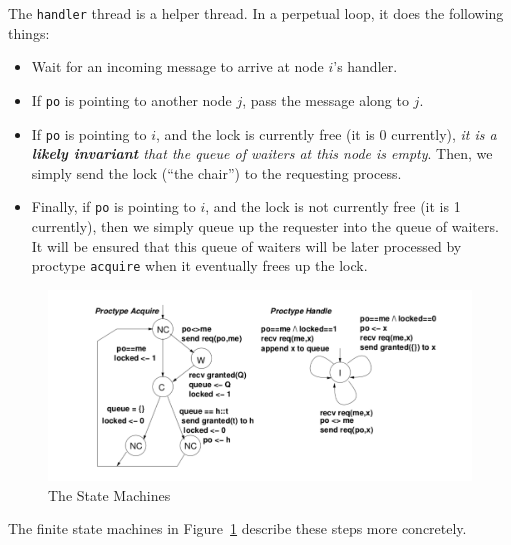\documentclass[11pt]{article}
\begin{document}
The {\tt handler} thread is a helper thread. In a perpetual loop, it
does the following things:
\begin{itemize}
\item Wait for an incoming message to arrive at node $i$'s handler.
\item If {\tt po} is pointing to another node $j$, pass the message along to $j$.
\item If {\tt po} is pointing to $i$, and the lock is currently free
   (it is 0 currently),
   {\em it is a {\bf likely invariant} that the queue of waiters at this node is empty}.
   Then, we simply send the lock (``the chair'') to the requesting process.
\item Finally, if
  {\tt po} is pointing to $i$, and the lock is not currently free (it is 1 currently),
  then we simply queue up the requester into the queue of waiters.
  It will be ensured that this queue of waiters will be later processed by
  proctype {\tt acquire} when it eventually frees up the lock.
\end{itemize}
%
\begin{figure}[tbhp]
\centering
\includegraphics[scale=0.4]{fig3.png}
 \caption{The State Machines}
 \label{fig:locking-prot-sm}
\end{figure}
%
The finite state machines in Figure~\ref{fig:locking-prot-sm}
describe these steps more concretely.
\end{document}
